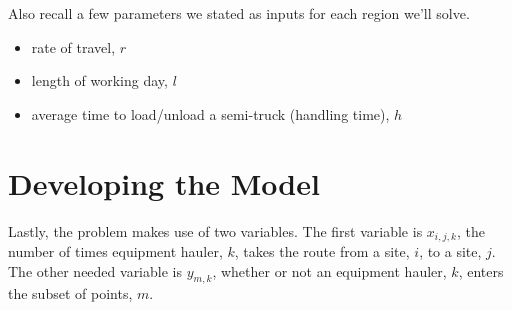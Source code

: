 \documentclass[letterpaper,10pt,english]{sphinxmanual}
\begin{document}
Also recall a few parameters we stated as inputs for each region we'll solve.
\begin{itemize}
\item {} 
rate of travel, \(r\)

\item {} 
length of working day, \(l\)

\item {} 
average time to load/unload a semi-truck (handling time), \(h\)

\end{itemize}


\section{Developing the Model}
\label{\detokenize{daily-routing:developing-the-model}}
Lastly, the problem makes use of two variables. The first variable is
\(x_{i,j,k}\), the number of times equipment hauler, \(k\), takes the
route from a site, \(i\), to a site, \(j\). The other needed variable
is \(y_{m,k}\), whether or not an equipment hauler, \(k\), enters the
subset of points, \(m\).
\end{document}
